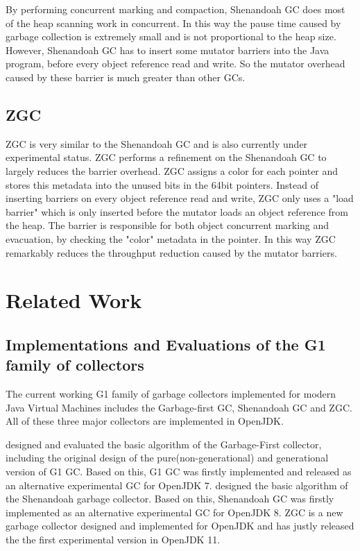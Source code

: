 By performing concurrent marking and compaction, Shenandoah GC does most of the
heap scanning work in concurrent. In this way the pause time caused by garbage collection
is extremely small and is not proportional to the heap size.
However, Shenandoah GC has to insert some mutator barriers into the Java program,
before every object reference read and write. So the mutator overhead caused by
these barrier is much greater than other GCs.

\subsection{ZGC}

ZGC is very similar to the Shenandoah GC and is also currently under experimental status.
ZGC performs a refinement on the Shenandoah GC to largely reduces the barrier
overhead.
ZGC assigns a color for each pointer and stores this metadata into the
unused bits in the 64bit pointers.
Instead of inserting barriers on every object reference read and write,
ZGC only uses a "load barrier" which is only inserted before the mutator loads an
object reference from the heap. The barrier is responsible for both object concurrent marking
and evacuation, by checking the "color" metadata in the pointer.
In this way ZGC remarkably reduces the throughput reduction caused by the mutator
barriers.

\section{Related Work}
\label{sec:relatedwork}

\subsection{Implementations and Evaluations of the G1 family of collectors}

The current working G1 family of garbage collectors implemented for modern Java Virtual Machines
includes the Garbage-first GC, Shenandoah GC and ZGC.
All of these three major collectors are implemented in OpenJDK.

\cite{detlefs2004garbage} designed and evaluated the basic algorithm of the Garbage-First collector,
including the original design of the pure(non-generational) and generational version
of G1 GC. Based on this, G1 GC was firstly implemented and released as an alternative
experimental GC for OpenJDK 7. \cite{flood2016shenandoah} designed the basic algorithm
of the Shenandoah garbage collector.
Based on this, Shenandoah GC was firstly implemented as an alternative experimental GC for OpenJDK 8.
ZGC is a new garbage collector designed and implemented for OpenJDK
and has justly released the the first experimental version in OpenJDK 11.

